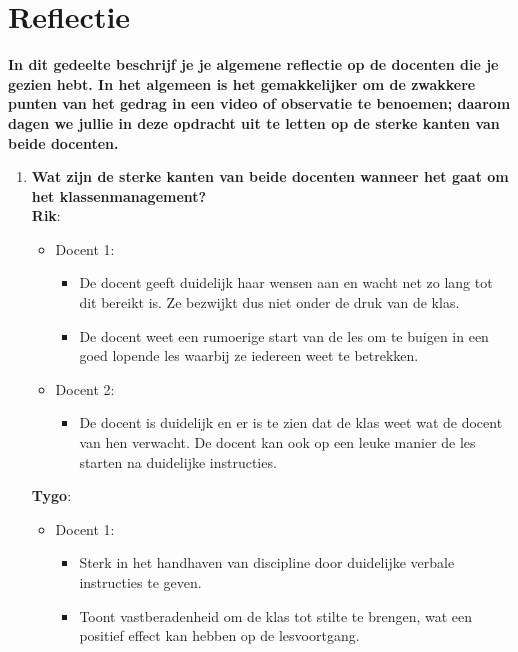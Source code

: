 \documentclass{article}
\begin{document}
    \section{Reflectie}
    \textbf{In dit gedeelte beschrijf je je algemene reflectie op de docenten die je gezien hebt. In het algemeen is het gemakkelijker om de zwakkere punten van het gedrag in een video of observatie te benoemen; daarom dagen we jullie in deze opdracht uit te letten op de sterke kanten van beide docenten.}
    \begin{enumerate}[label=(\alph*)]
        \item \textbf{Wat zijn de sterke kanten van beide docenten wanneer het gaat om het klassenmanagement?} \\
        \textbf {Rik}: 
            \begin{itemize}
                \item Docent 1:
                    \begin{itemize}
                        \item De docent geeft duidelijk haar wensen aan en wacht net zo lang tot dit bereikt is. Ze bezwijkt dus niet onder de druk van de klas.
                        \item De docent weet een rumoerige start van de les om te buigen in een goed lopende les waarbij ze iedereen weet te betrekken.
                    \end{itemize}
                \item Docent 2:
                    \begin{itemize}
                        \item De docent is duidelijk en er is te zien dat de klas weet wat de docent van hen verwacht. De docent kan ook op een leuke manier de les starten na duidelijke instructies.
                    \end{itemize}
            \end{itemize}
        \textbf{Tygo}: 
            \begin{itemize}
                \item Docent 1:
                    \begin{itemize}
                        \item Sterk in het handhaven van discipline door duidelijke verbale instructies te geven.
                        \item Toont vastberadenheid om de klas tot stilte te brengen, wat een positief effect kan hebben op de lesvoortgang.
                    \end{itemize}

\end{itemize}
\end{enumerate}
\end{document}
